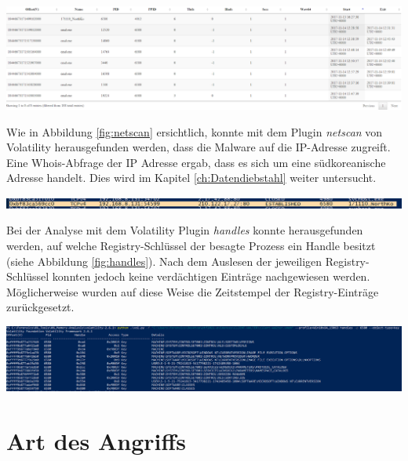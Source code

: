 \begin{center}
	\includegraphics[width=15.8cm]{figures/processlist.png}
	\label{fig:processlist}
\end{center}

\newpage
Wie in Abbildung \ref{fig:netscan} ersichtlich, konnte mit dem Plugin \textit{netscan} von Volatility herausgefunden werden, dass die Malware auf die IP-Adresse  zugreift.
Eine Whois-Abfrage der IP Adresse ergab, dass es sich um eine südkoreanische Adresse handelt.
Dies wird im Kapitel \ref{ch:Datendiebstahl} weiter untersucht.

\begin{center}
	\includegraphics[width=15.8cm]{figures/netscan.png}
	\label{fig:netscan}
\end{center}

Bei der Analyse mit dem Volatility Plugin \textit{handles} konnte herausgefunden werden, auf welche Registry-Schlüssel der besagte Prozess ein Handle besitzt (siehe Abbildung \ref{fig:handles}).
Nach dem Auslesen der jeweiligen Registry-Schlüssel konnten jedoch keine verdächtigen Einträge nachgewiesen werden.
Möglicherweise wurden auf diese Weise die Zeitstempel der Registry-Einträge zurückgesetzt.

\begin{center}
	\includegraphics[width=15.8cm]{figures/volatility-handles.png}
	\label{fig:handles}
\end{center}

\chapter{Art des Angriffs}

